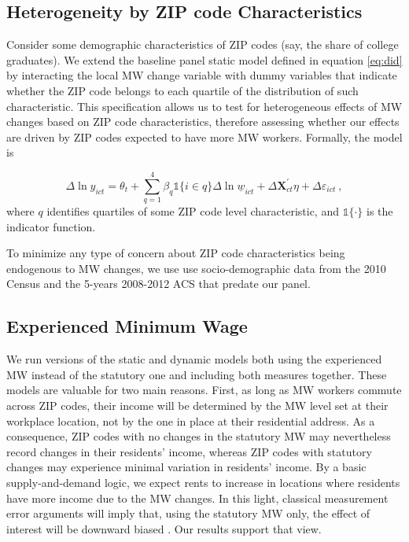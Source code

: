 \subsection{Heterogeneity by ZIP code Characteristics}\label{sec:strategy_heterogeneity}

Consider some demographic characteristics of ZIP codes (say, the share of college graduates).
We extend the baseline panel static model defined in equation \eqref{eq:did} by interacting the local 
MW change variable with dummy variables that indicate whether the ZIP code belongs to each 
quartile of the distribution of such characteristic. This specification allows us to test for 
heterogeneous effects of MW changes based on ZIP code characteristics, therefore assessing 
whether our effects are driven by ZIP codes expected to have more MW workers. Formally, the 
model is

\begin{equation}\label{eq:diff_main_hetero} 
    \Delta \ln y_{ict} = \theta_t
    				+ \sum_{q = 1}^4 \beta_q \mathds{1}\{i \in q\} \Delta \ln \underline{w}_{ict}
    				+ \Delta \mathbf{X}^{'}_{ct}\eta
    				+ \Delta \varepsilon_{ict} \ ,
\end{equation}
where $q$ identifies quartiles of some ZIP code level characteristic, and $\mathds{1}\{\cdot\}$ 
is the indicator function.

To minimize any type of concern about ZIP code characteristics being endogenous to MW changes, 
we use use socio-demographic data from the 2010 Census and the 5-years 2008-2012 ACS that 
predate our panel.


\subsection{Experienced Minimum Wage}\label{sec:emp_strategy_expmw}

We run versions of the static and dynamic models both using the experienced MW instead 
of the statutory one and including both measures together. These models are valuable for two main 
reasons. First, as long as MW workers commute across ZIP codes, their income will be determined 
by the MW level set at their workplace location, not by the one in place at their residential 
address. As a consequence, ZIP codes with no changes in the statutory MW may nevertheless record 
changes in their residents' income, whereas ZIP codes with statutory changes may experience minimal 
variation in residents' income. By a basic supply-and-demand logic, we expect rents to increase in 
locations where residents have more income due to the MW changes. In this light, classical 
measurement error arguments will imply that, using the statutory MW only, the effect of interest 
will be downward biased \parencite{AngristPischke2009}. Our results support that view. 

